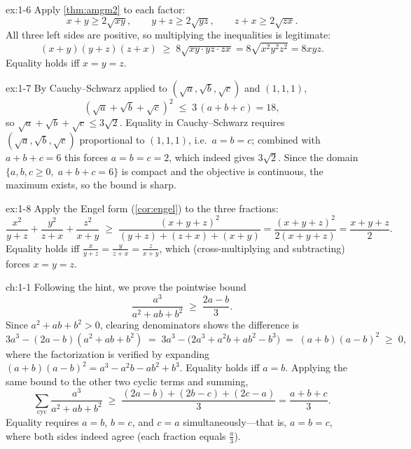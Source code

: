 \begin{solution}{ex:1-6}
Apply \cref{thm:amgm2} to each factor:
\[
  x+y \ge 2\sqrt{xy}, \qquad
  y+z \ge 2\sqrt{yz}, \qquad
  z+x \ge 2\sqrt{zx}.
\]
All three left sides are positive, so multiplying the inequalities is
legitimate:
\[
  (x+y)(y+z)(z+x) \;\ge\; 8\sqrt{xy \cdot yz \cdot zx}
  = 8\sqrt{x^2y^2z^2} = 8xyz .
\]
Equality holds iff $x=y=z$.
\end{solution}

\begin{solution}{ex:1-7}
By Cauchy--Schwarz applied to
$(\sqrt a, \sqrt b, \sqrt c)$ and $(1,1,1)$,
\[
  (\sqrt a + \sqrt b + \sqrt c)^2
  \;\le\; 3\,(a+b+c) = 18,
\]
so $\sqrt a + \sqrt b + \sqrt c \le 3\sqrt2$.
Equality in Cauchy--Schwarz requires
$(\sqrt a, \sqrt b, \sqrt c)$ proportional to $(1,1,1)$, i.e.\
$a=b=c$; combined with $a+b+c=6$ this forces $a=b=c=2$, which
indeed gives $3\sqrt2$. Since the domain $\{a,b,c \ge 0,\;
a+b+c=6\}$ is compact and the objective is continuous, the maximum
exists, so the bound is sharp.
\end{solution}

\begin{solution}{ex:1-8}
Apply the Engel form (\cref{cor:engel}) to the three fractions:
\[
  \frac{x^2}{y+z} + \frac{y^2}{z+x} + \frac{z^2}{x+y}
  \;\ge\;
  \frac{(x+y+z)^2}{(y+z)+(z+x)+(x+y)}
  = \frac{(x+y+z)^2}{2(x+y+z)}
  = \frac{x+y+z}{2} .
\]
Equality holds iff $\tfrac{x}{y+z} = \tfrac{y}{z+x} = \tfrac{z}{x+y}$,
which (cross-multiplying and subtracting) forces $x=y=z$.
\end{solution}

\begin{solution}{ch:1-1}
Following the hint, we prove the pointwise bound
\[
  \frac{a^3}{a^2+ab+b^2} \;\ge\; \frac{2a-b}{3} .
\]
Since $a^2+ab+b^2 > 0$, clearing denominators shows the difference is
\[
  3a^3 - (2a-b)(a^2+ab+b^2)
  \;=\; 3a^3 - \big(2a^3 + a^2b + ab^2 - b^3\big)
  \;=\; (a+b)(a-b)^2 \;\ge\; 0,
\]
where the factorization is verified by expanding
$(a+b)(a-b)^2 = a^3 - a^2b - ab^2 + b^3$. Equality holds iff $a=b$.
Applying the same bound to the other two cyclic terms and summing,
\[
  \sum_{\text{cyc}} \frac{a^3}{a^2+ab+b^2}
  \;\ge\;
  \frac{(2a-b) + (2b-c) + (2c-a)}{3}
  = \frac{a+b+c}{3} .
\]
Equality requires $a=b$, $b=c$, and $c=a$ simultaneously---that is,
$a=b=c$, where both sides indeed agree (each fraction equals
$\tfrac{a}{3}$).
\end{solution}

